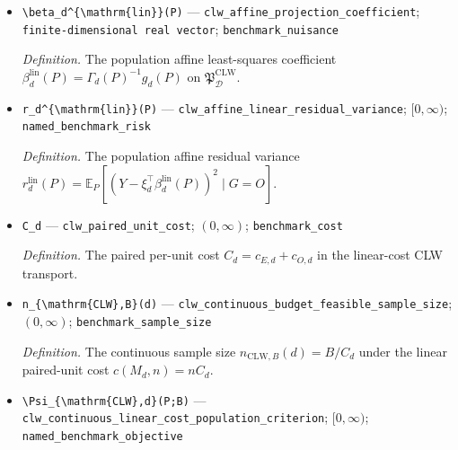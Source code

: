 \documentclass{article}
\begin{document}
\begin{itemize}
  \par\smallskip\noindent\emph{Definition.} The observational outcome cross moment \(g_d(P)=\mathbb E_P[\xi_dY\mid G=O]\).
  \item \texttt{\textbackslash{}\allowbreak{}beta\_\allowbreak{}d\textasciicircum{}\{\textbackslash{}\allowbreak{}mathrm\{lin\}\allowbreak{}\}\allowbreak{}(P)} --- \texttt{clw\_\allowbreak{}affine\_\allowbreak{}projection\_\allowbreak{}coefficient}; \texttt{finite-\allowbreak{}dimensional real vector}; \texttt{benchmark\_\allowbreak{}nuisance}
  \par\smallskip\noindent\emph{Definition.} The population affine least-squares coefficient \(\beta_d^{\mathrm{lin}}(P)=\Gamma_d(P)^{-1}g_d(P)\) on \(\mathfrak P_{\mathcal D}^{\mathrm{CLW}}\).
  \item \texttt{r\_\allowbreak{}d\textasciicircum{}\{\textbackslash{}\allowbreak{}mathrm\{lin\}\allowbreak{}\}\allowbreak{}(P)} --- \texttt{clw\_\allowbreak{}affine\_\allowbreak{}linear\_\allowbreak{}residual\_\allowbreak{}variance}; \([0,\infty)\); \texttt{named\_\allowbreak{}benchmark\_\allowbreak{}risk}
  \par\smallskip\noindent\emph{Definition.} The population affine residual variance \(r_d^{\mathrm{lin}}(P)=\mathbb E_P[(Y-\xi_d^\top\beta_d^{\mathrm{lin}}(P))^2\mid G=O]\).
  \item \texttt{C\_\allowbreak{}d} --- \texttt{clw\_\allowbreak{}paired\_\allowbreak{}unit\_\allowbreak{}cost}; \((0,\infty)\); \texttt{benchmark\_\allowbreak{}cost}
  \par\smallskip\noindent\emph{Definition.} The paired per-unit cost \(C_d=c_{E,d}+c_{O,d}\) in the linear-cost CLW transport.
  \item \texttt{n\_\allowbreak{}\{\textbackslash{}\allowbreak{}mathrm\{CLW\}\allowbreak{},\allowbreak{}B\}\allowbreak{}(d)} --- \texttt{clw\_\allowbreak{}continuous\_\allowbreak{}budget\_\allowbreak{}feasible\_\allowbreak{}sample\_\allowbreak{}size}; \((0,\infty)\); \texttt{benchmark\_\allowbreak{}sample\_\allowbreak{}size}
  \par\smallskip\noindent\emph{Definition.} The continuous sample size \(n_{\mathrm{CLW},B}(d)=B/C_d\) under the linear paired-unit cost \(c(M_d,n)=nC_d\).
  \item \texttt{\textbackslash{}\allowbreak{}Psi\_\allowbreak{}\{\textbackslash{}\allowbreak{}mathrm\{CLW\}\allowbreak{},\allowbreak{}d\}\allowbreak{}(P;\allowbreak{}B)} --- \texttt{clw\_\allowbreak{}continuous\_\allowbreak{}linear\_\allowbreak{}cost\_\allowbreak{}population\_\allowbreak{}criterion}; \([0,\infty)\); \texttt{named\_\allowbreak{}benchmark\_\allowbreak{}objective}

\end{itemize}
\end{document}
